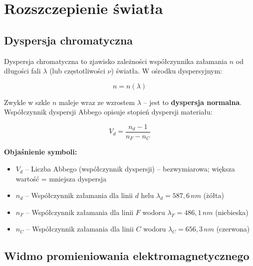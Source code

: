 \documentclass[12pt,a4paper]{article}
\newcommand{\oznaczenie}[2]{%
  \item $#1$ -- #2%
}
\begin{document}
\newpage
\section{Rozszczepienie światła}

\subsection{Dyspersja chromatyczna}

Dyspersja chromatyczna to zjawisko zależności współczynnika załamania $n$ od
długości fali $\lambda$ (lub częstotliwości $\nu$) światła.  W ośrodku dyspersyjnym:

\begin{wzorbox}
\begin{equation}
  n = n(\lambda)
  \label{eq:dyspersja}
\end{equation}
\end{wzorbox}

Zwykle w szkle $n$ maleje wraz ze wzrostem $\lambda$ -- jest to
\textbf{dyspersja normalna}.  Współczynnik dyspersji Abbego opisuje stopień
dyspersji materiału:

\begin{wzorbox}
\begin{equation}
  V_d = \frac{n_d - 1}{n_F - n_C}
  \label{eq:liczba_abbego}
\end{equation}
\end{wzorbox}

\begin{objasnbox}
\textbf{Objaśnienie symboli:}
\begin{itemize}[leftmargin=2em]
  \oznaczenie{V_d}{Liczba Abbego (współczynnik dyspersji) -- bezwymiarowa;
                   większa wartość = mniejsza dyspersja}
  \oznaczenie{n_d}{Współczynnik załamania dla linii $d$ helu $\lambda_d = 587{,}6\,\si{nm}$
                   (żółta)}
  \oznaczenie{n_F}{Współczynnik załamania dla linii $F$ wodoru $\lambda_F = 486{,}1\,\si{nm}$
                   (niebieska)}
  \oznaczenie{n_C}{Współczynnik załamania dla linii $C$ wodoru $\lambda_C = 656{,}3\,\si{nm}$
                   (czerwona)}
\end{itemize}
\end{objasnbox}

\subsection{Widmo promieniowania elektromagnetycznego}
\end{document}

